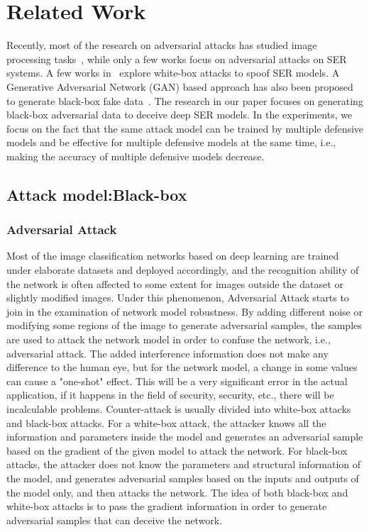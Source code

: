 \chapter{Related Work}
\label{chap:relatedwork}
Recently, most of the research on adversarial attacks has studied image processing tasks~\cite{akhtar2018threat}, while only a few works focus on adversarial attacks on SER systems. A few works in~\cite{gong2017crafting} explore white-box attacks to spoof SER models. A Generative Adversarial Network (GAN) based approach has also been proposed to generate black-box fake data~\cite{latif2018adversarial}. The research in our paper focuses on generating black-box adversarial data to deceive deep SER models. In the experiments, we focus on the fact that the same attack model can be trained by multiple defensive models and be effective for multiple defensive models at the same time, i.e., making the accuracy of multiple defensive models decrease.

\section{Attack model:Black-box}

\subsection{Adversarial Attack}

Most of the image classification networks based on deep learning are trained under elaborate datasets and deployed accordingly, and the recognition ability of the network is often affected to some extent for images outside the dataset or slightly modified images.
Under this phenomenon, Adversarial Attack starts to join in the examination of network model robustness.
By adding different noise or modifying some regions of the image to generate adversarial samples, the samples are used to attack the network model in order to confuse the network, i.e., adversarial attack.
The added interference information does not make any difference to the human eye, but for the network model, a change in some values can cause a "one-shot" effect. This will be a very significant error in the actual application, if it happens in the field of security, security, etc., there will be incalculable problems.
Counter-attack is usually divided into white-box attacks and black-box attacks. For a white-box attack, the attacker knows all the information and parameters inside the model and generates an adversarial sample based on the gradient of the given model to attack the network. For black-box attacks, the attacker does not know the parameters and structural information of the model, and generates adversarial samples based on the inputs and outputs of the model only, and then attacks the network. The idea of both black-box and white-box attacks is to pass the gradient information in order to generate adversarial samples that can deceive the network.

